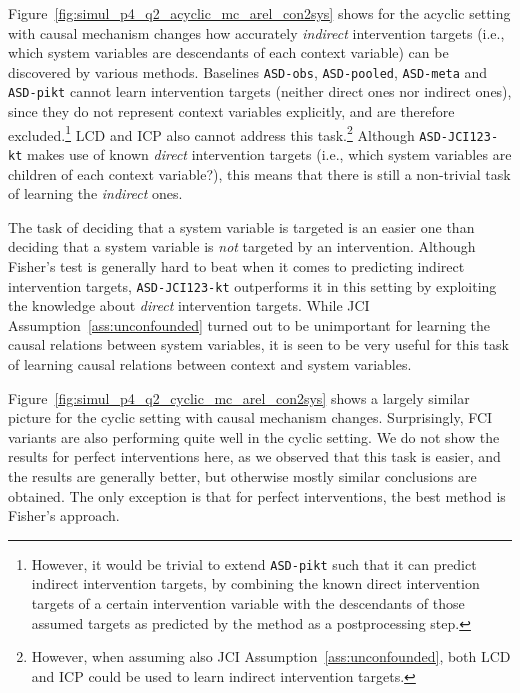 \documentclass[twoside,11pt]{article}
\newcommand{\alg}[1]{\texttt{#1}}
\begin{document}
Figure~\ref{fig:simul_p4_q2_acyclic_mc_arel_con2sys} shows for the acyclic setting with causal mechanism changes
how accurately \emph{indirect} intervention targets (i.e., which system variables are descendants of each context
variable) can be discovered by various methods.
Baselines \alg{ASD-obs}, \alg{ASD-pooled}, \alg{ASD-meta} and \alg{ASD-pikt} cannot learn intervention targets
(neither direct ones nor indirect ones), since they do not represent context variables explicitly, and are therefore excluded.\footnote{However, it would be
trivial to extend \alg{ASD-pikt} such that it can predict indirect intervention targets, by combining the known direct 
intervention targets of a certain intervention variable with the descendants of those assumed
targets as predicted by the method as a postprocessing step.}
LCD and ICP also cannot address this task.\footnote{However, when assuming also JCI Assumption~\ref{ass:unconfounded},
both LCD and ICP could be used to learn indirect intervention targets.} Although \alg{ASD-JCI123-kt} makes use of known 
\emph{direct} intervention targets (i.e., which system variables are children of each context variable?), 
this means that there is still a non-trivial task of learning the \emph{indirect} ones.

The task of deciding that a system variable is targeted is an easier one than deciding that a system variable
is \emph{not} targeted by an intervention. 
Although Fisher's test is generally hard to beat when it comes to 
predicting indirect intervention targets, \alg{ASD-JCI123-kt} outperforms it in this setting by exploiting the knowledge about \emph{direct} intervention targets. 
While JCI Assumption~\ref{ass:unconfounded} turned out to be unimportant for 
learning the causal relations between system variables, it is seen to be very useful for this task of 
learning causal relations between context and system variables.

Figure~\ref{fig:simul_p4_q2_cyclic_mc_arel_con2sys} shows a largely similar picture for the cyclic setting with
causal mechanism changes. Surprisingly, FCI variants are also performing quite well in the cyclic setting.
We do not show the results for perfect interventions here, as we observed that this task is easier, and the results are generally 
better, but otherwise mostly similar conclusions are obtained. The only exception is that for perfect
interventions, the best method is Fisher's approach.
\end{document}
